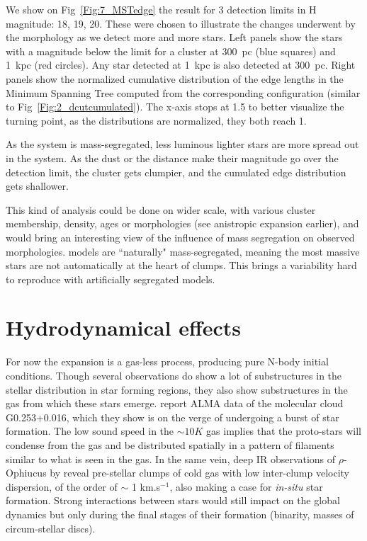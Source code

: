 We show on Fig~\ref{Fig:7_MSTedge} the result for 3 detection limits in H magnitude: 18, 19, 20. These were chosen to illustrate the changes underwent by the morphology as we detect more and more stars. Left panels show the stars with a magnitude below the limit for a cluster at 300~pc (blue squares) and 1~kpc (red circles). Any star detected at 1~kpc is also detected at 300~pc. Right panels show the normalized cumulative distribution of the edge lengths in the Minimum Spanning Tree computed from the corresponding configuration (similar to Fig~\ref{Fig:2_dcutcumulated}). The x-axis stops at 1.5 to better visualize the turning point, as the distributions are normalized, they both reach 1.



As the system is mass-segregated, less luminous lighter stars are more spread out in the system. As the dust or the distance make their magnitude go over the detection limit, the cluster gets clumpier, and the cumulated edge distribution gets shallower. 

This kind of analysis could be done on wider scale, with various cluster membership, density, ages or morphologies (see anistropic expansion earlier), and would bring an interesting view of the influence of mass segregation on observed morphologies. \HubLem models are ``naturally" mass-segregated, meaning the most massive stars are not automatically at the heart of clumps. This brings a variability hard to reproduce with artificially segregated models. 



\section{Hydrodynamical effects}

For now the \HubLem expansion is a gas-less process, producing pure N-body initial conditions. Though several observations do show a lot of substructures in the stellar distribution in star forming regions, they also show  substructures in the gas from which these stars emerge. \cite{Rathborne2015} report ALMA data of the molecular cloud G0.253+0.016, which they show is on the verge of undergoing a burst of star formation. The low sound speed in the $\sim 10K$ gas implies that the proto-stars will condense from the gas and be distributed spatially in a pattern of filaments similar to what is seen in the gas. In the same vein, deep IR observations of $\rho$-Ophiucus by \cite{Andre2007} reveal pre-stellar clumps of cold gas with low inter-clump velocity dispersion, of the order of $\sim$ 1 km.s$^{-1}$, also making a case  for {\it in-situ} star formation. Strong interactions between stars would still impact on the global dynamics but only during the final stages of their formation (binarity, masses of circum-stellar discs).

